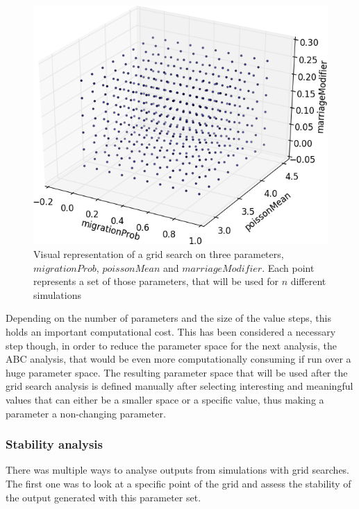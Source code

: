 \documentclass[a4paper,12pt]{report}
\begin{document}
\begin{figure}[!ht]
	\centering
	\includegraphics[width=1\textwidth]{../data/grid.png}
	\caption{Visual representation of a grid search on three parameters, $migrationProb$, $poissonMean$ and $marriageModifier$. Each point represents a set of those parameters, that will be used for $n$ different simulations}
	\label{grid}
\end{figure}

Depending on the number of parameters and the size of the value steps, this holds an important computational cost. This has been considered a necessary step though, in order to reduce the parameter space for the next analysis, the ABC analysis, that would be even more computationally consuming if run over a huge parameter space. The resulting parameter space that will be used after the grid search analysis is defined manually after selecting interesting and meaningful values that can either be a smaller space or a specific value, thus making a parameter a non-changing parameter.

\subsubsection{Stability analysis}
There was multiple ways to analyse outputs from simulations with grid searches. The first one was to look at a specific point of the grid and assess the stability of the output generated with this parameter set.
\end{document}
